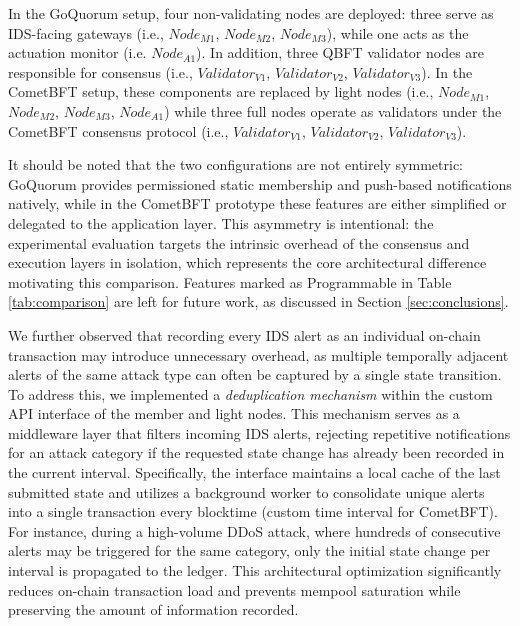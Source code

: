 In the GoQuorum setup, four non-validating nodes are deployed: three serve as IDS-facing gateways (i.e., $Node_{M1}$,  $Node_{M2}$, $Node_{M3}$), while one acts as the actuation monitor (i.e. $Node_{A1}$). In addition, three QBFT validator nodes are responsible for consensus (i.e., $Validator_{V1}$,  $Validator_{V2}$, $Validator_{V3}$). In the CometBFT setup, these components are replaced by light nodes (i.e., $Node_{M1}$,  $Node_{M2}$, $Node_{M3}$, $Node_{A1}$) while three full nodes operate as validators under the CometBFT consensus protocol (i.e., $Validator_{V1}$,  $Validator_{V2}$, $Validator_{V3}$).

It should be noted that the two configurations are not entirely symmetric: GoQuorum provides permissioned static membership and push-based notifications natively, while in the CometBFT prototype these features are either simplified or delegated to the application layer. This asymmetry is intentional: the experimental evaluation targets the intrinsic overhead of the consensus and execution layers in isolation, which represents the core architectural difference motivating this comparison. Features marked as Programmable in Table \ref{tab:comparison} are left for future work, as discussed in Section \ref{sec:conclusions}.


We further observed that recording every IDS alert as an individual on-chain transaction may introduce unnecessary overhead, as multiple temporally adjacent alerts of the same attack type can often be captured by a single state transition. To address this, we implemented a \textit{deduplication mechanism} within the custom API interface of the member and light nodes. This mechanism serves as a middleware layer that filters incoming IDS alerts, rejecting repetitive notifications for an attack category if the requested state change has already been recorded in the current interval. 
Specifically, the interface maintains a local cache of the last submitted state and utilizes a background worker to consolidate unique alerts into a single transaction every blocktime (custom time interval for CometBFT). For instance, during a high-volume DDoS attack, where hundreds of consecutive alerts may be triggered for the same category, only the initial state change per interval is propagated to the ledger. This architectural optimization significantly reduces on-chain transaction load and prevents mempool saturation while preserving the amount of information recorded.

